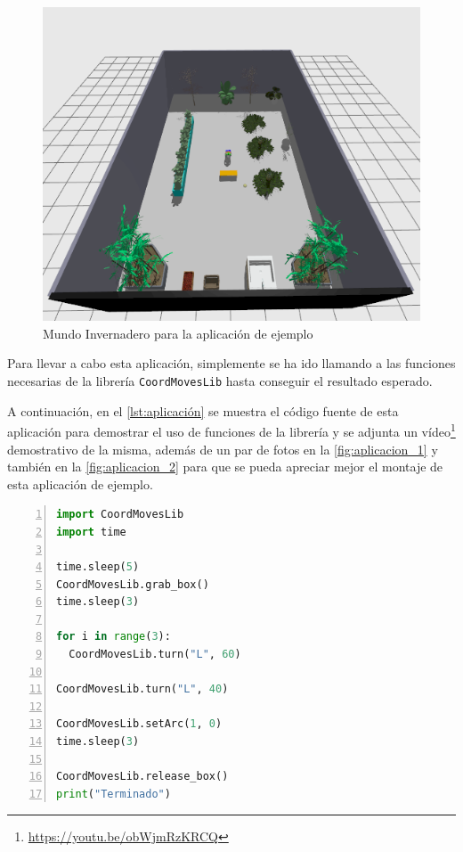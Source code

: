 \begin{figure}[H]
  \centering
  \includegraphics[width=1\textwidth]{figures/cap_4/mundo_invernadero.png}
  \caption{Mundo Invernadero para la aplicación de ejemplo}
  \label{fig:mundo_invernadero}
\end{figure}

Para llevar a cabo esta aplicación, simplemente se ha ido llamando a las funciones necesarias de la librería \texttt{CoordMovesLib} hasta conseguir el resultado esperado.

A continuación, en el \autoref{lst:aplicación} se muestra el código fuente de esta aplicación para demostrar el uso de funciones de la librería y se adjunta un vídeo\footnote{\url{https://youtu.be/obWjmRzKRCQ}} demostrativo de la misma, además de un par de  fotos en la \autoref{fig:aplicacion_1} y también en la \autoref{fig:aplicacion_2} para que se pueda apreciar mejor el montaje de esta aplicación de ejemplo.

\begin{lstlisting}[language=Python, caption={Aplicación GreenNao}, label={lst:aplicación}, numbers=left, backgroundcolor=\color{gray!10}]
import CoordMovesLib
import time

time.sleep(5)
CoordMovesLib.grab_box()
time.sleep(3)

for i in range(3):
  CoordMovesLib.turn("L", 60)

CoordMovesLib.turn("L", 40)

CoordMovesLib.setArc(1, 0)
time.sleep(3)

CoordMovesLib.release_box()
print("Terminado")
\end{lstlisting}

